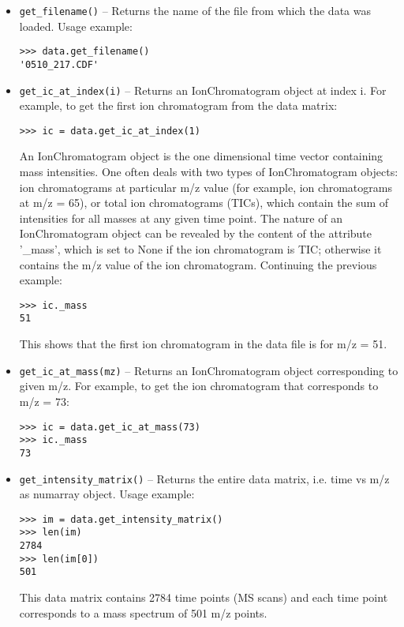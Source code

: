 \begin{itemize}

\item {\tt get\_filename()} -- Returns the name of the file from which
the data was loaded. Usage example:

\begin{verbatim}
>>> data.get_filename()
'0510_217.CDF'
\end{verbatim}

\item {\tt get\_ic\_at\_index(i)} -- Returns an IonChromatogram object
at index i.  For example, to get the first ion chromatogram from the data
matrix:

\begin{verbatim}
>>> ic = data.get_ic_at_index(1)
\end{verbatim}

\noindent
An IonChromatogram object is the one dimensional time vector containing
mass intensities.  One often deals with two types of IonChromatogram
objects: ion chromatograms at particular m/z value (for example, ion
chromatograms at m/z = 65), or total ion chromatograms (TICs), which
contain the sum of intensities for all masses at any given time point. 
The nature of an IonChromatogram object can be revealed by the content
of the attribute '\_mass', which is set to None if the ion chromatogram
is TIC; otherwise it contains the m/z value of the ion chromatogram.
Continuing the previous example:

\begin{verbatim}
>>> ic._mass
51
\end{verbatim}

\noindent
This shows that the first ion chromatogram in the data file is for
m/z = 51.

\item {\tt get\_ic\_at\_mass(mz)} -- Returns an IonChromatogram
object corresponding to given m/z. For example, to get the ion
chromatogram that corresponds to m/z = 73:

\begin{verbatim}
>>> ic = data.get_ic_at_mass(73)
>>> ic._mass
73
\end{verbatim}

\item {\tt get\_intensity\_matrix()} -- Returns the entire data
matrix, i.e. time vs m/z as numarray object. Usage example:

\begin{verbatim}
>>> im = data.get_intensity_matrix()
>>> len(im)
2784
>>> len(im[0])
501
\end{verbatim}

This data matrix contains 2784 time points (MS scans) and each time
point corresponds to a mass spectrum of 501 m/z points.

\end{itemize}


